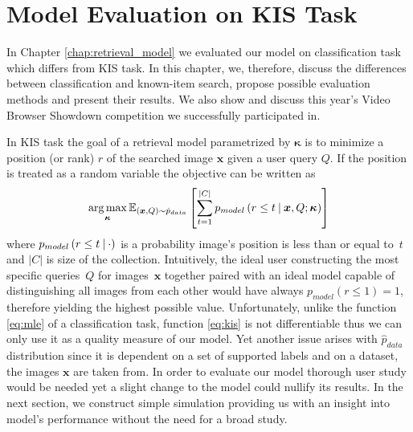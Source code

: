\chapter{Model Evaluation on KIS Task}\label{chap:evaluation}
In Chapter \ref{chap:retrieval_model} we evaluated our model on classification task which differs from KIS task. In this chapter, we, therefore, discuss the differences between classification and known-item search, propose possible evaluation methods and present their results. We also show and discuss this year's Video Browser Showdown competition we successfully participated in.

In KIS task the goal of a retrieval model parametrized by $\bm{\kappa}$ is to minimize a position (or rank) $r$ of the searched image $\bm{x}$ given a user query $Q$. If the position is treated as a random variable the objective can be written as
\begin{equation}
\mathop{\arg\max}_{\bm{\kappa}}\mathbb{E}_{\left(\bm{x},Q\right)\sim \hat{p}_{data}}\left[
\sum_{t=1}^{|C|}p_{model}\left(r\leq t\:\vert\:\bm{x}, Q;\bm{\kappa}\right)
\right]\label{eq:kis}
\end{equation}
where $p_{model}\left(r\leq t\:\vert\:\cdot\right)$ is a probability image's position is less than or equal to~$t$ and $|C|$ is size of the collection. Intuitively, the ideal user constructing the most specific queries~$Q$ for images~$\bm{x}$ together paired with an ideal model capable of distinguishing all images from each other would have always ${p_{model}\left(r\leq 1\right)=1}$, therefore yielding the highest possible value. Unfortunately, unlike the function \ref{eq:mle} of a classification task, function \ref{eq:kis} is not differentiable thus we can only use it as a quality measure of our model. Yet another issue arises with $\hat{p}_{data}$ distribution since it is dependent on a set of supported labels and on a dataset, the images $\bm{x}$ are taken from. In order to evaluate our model thorough user study would be needed yet a slight change to the model could nullify its results. In the next section, we construct simple simulation providing us with an insight into model's performance without the need for a broad study.

